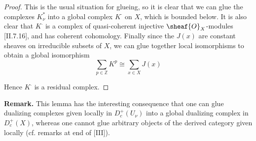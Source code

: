 \documentclass[12pt]{book}
\begin{document}
\begin{proof}
This is the usual situation for glueing, so it is clear that we can glue the complexes \(K_{\nu}^{*}\) into a global complex \(K^{\cdot}\) on \(X\), which is bounded below. It is also clear that \(K^{\cdot}\) is a complex of quasi-coherent injective \(\sheaf{O}_{X}\)-modules [II.7.16], and has coherent cohomology. Finally since the \(J(x)\) are constant sheaves on irreducible subsets of \(X\), we can glue together local isomorphisms to obtain a global isomorphism
\[
\sum_{p \in \mathbb{Z}} K^{p} \cong \sum_{x \in X} J(x)
\]

\setcounter{page}{310}
Hence \(K^{\cdot}\) is a residual complex.
\end{proof}

\textbf{Remark.} This lemma has the interesting consequence that one can glue dualizing complexes given locally in \(D_{c}^{+}(U_{\nu})\) into a global dualizing complex in \(D_{c}^{+}(X)\), whereas one cannot glue arbitrary objects of the derived category given locally (cf. remarks at end of [III]).
\end{document}
